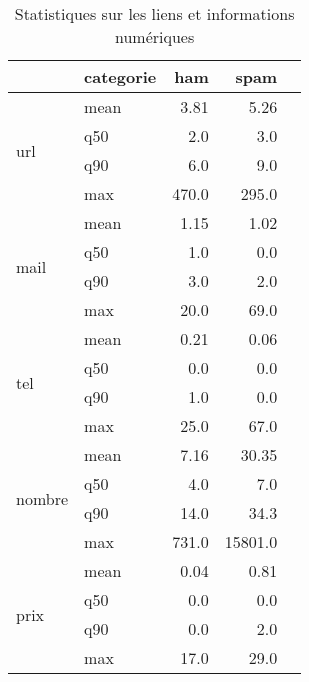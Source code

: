 \begin{table}[H]
\centering
\caption{Statistiques sur les liens et informations numériques}
\label{tab:p1liens}
\begin{tabular}{ll|rrr}
\toprule
 & categorie & ham & spam \\
\midrule
\multirow[c]{4}{*}{url} & mean & 3.81 & 5.26 \\
 & q50 & 2.0 & 3.0 \\
 & q90 & 6.0 & 9.0 \\
 & max & 470.0 & 295.0 \\
\cline{1-4}
\multirow[c]{4}{*}{mail} & mean & 1.15 & 1.02 \\
 & q50 & 1.0 & 0.0 \\
 & q90 & 3.0 & 2.0 \\
 & max & 20.0 & 69.0 \\
\cline{1-4}
\multirow[c]{4}{*}{tel} & mean & 0.21 & 0.06 \\
 & q50 & 0.0 & 0.0 \\
 & q90 & 1.0 & 0.0 \\
 & max & 25.0 & 67.0 \\
\cline{1-4}
\multirow[c]{4}{*}{nombre} & mean & 7.16 & 30.35 \\
 & q50 & 4.0 & 7.0 \\
 & q90 & 14.0 & 34.3 \\
 & max & 731.0 & 15801.0 \\
\cline{1-4}
\multirow[c]{4}{*}{prix} & mean & 0.04 & 0.81 \\
 & q50 & 0.0 & 0.0 \\
 & q90 & 0.0 & 2.0 \\
 & max & 17.0 & 29.0 \\
\cline{1-4}
\bottomrule
\end{tabular}
\end{table}
